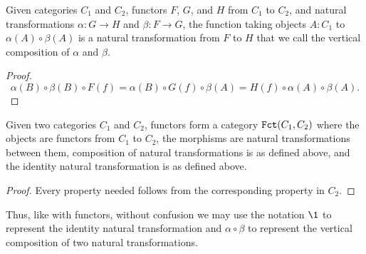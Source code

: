 \documentclass[../math.tex]{subfiles}
\begin{document}
\begin{theorem}
    Given categories $C_1$ and $C_2$, functors $F$, $G$, and $H$ from $C_1$
    to $C_2$, and natural transformations $\alpha : G \to H$ and $\beta : F \to
    G$, the function taking objects $A : C_1$ to $\alpha(A) \circ \beta(A)$ is a
    natural transformation from $F$ to $H$ that we call the vertical composition
    of $\alpha$ and $\beta$.
\end{theorem}
\begin{proof}
    \[
        \alpha(B) \circ \beta(B) \circ F(f) =
        \alpha(B) \circ G(f) \circ \beta(A) =
        H(f) \circ \alpha(A) \circ \beta(A).
    \]
\end{proof}

\begin{theorem}
    Given two categories $C_1$ and $C_2$, functors form a category $\Fct(C_1,
    C_2)$ where the objects are functors from $C_1$ to $C_2$, the morphisms are
    natural transformations between them, composition of natural transformations
    is as defined above, and the identity natural transformation is as defined
    above.
\end{theorem}
\begin{proof}
    Every property needed follows from the corresponding property in $C_2$.
\end{proof}

Thus, like with functors, without confusion we may use the notation $\1$
to represent the identity natural transformation and $\alpha \circ \beta$ to
represent the vertical composition of two natural transformations.
\end{document}
